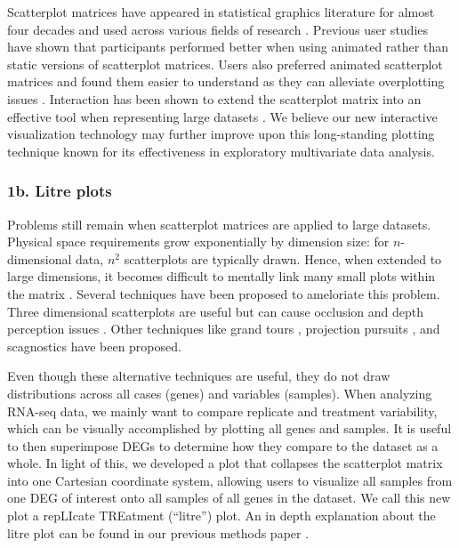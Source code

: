 \documentclass{bmcart}
\begin{document}
Scatterplot matrices have appeared in statistical graphics literature for almost four decades and used across various fields of research \cite{becker1984brushing, carr1984graphical, tufte2001visual, tukey1981graphical}. Previous user studies have shown that participants performed better when using animated rather than static versions of scatterplot matrices. Users also preferred animated scatterplot matrices and found them easier to understand as they can alleviate overplotting issues \cite{chen2018using}. Interaction has been shown to extend the scatterplot matrix into an effective tool when representing large datasets \cite{carr1987scatterplot}. We believe our new interactive visualization technology may further improve upon this long-standing plotting technique known for its effectiveness in exploratory multivariate data analysis.

\subsubsection*{1b. Litre plots}

Problems still remain when scatterplot matrices are applied to large datasets. Physical space requirements grow exponentially by dimension size: for $n$-dimensional data, $n^2$ scatterplots are typically drawn. Hence, when extended to large dimensions, it becomes difficult to mentally link many small plots within the matrix \cite{kerren2007human}. Several techniques have been proposed to ameloriate this problem. Three dimensional scatterplots are useful but can cause occlusion and depth perception issues \cite{kerren2007human}. Other techniques like grand tours \cite{asimov1985grand}, projection pursuits \cite{friedman1974projection, cook1995grand}, and scagnostics \cite{wilkinson2005graph} have been proposed.

Even though these alternative techniques are useful, they do not draw distributions across all cases (genes) and variables (samples). When analyzing RNA-seq data, we mainly want to compare replicate and treatment variability, which can be visually accomplished by plotting all genes and samples. It is useful to then superimpose DEGs to determine how they compare to the dataset as a whole. In light of this, we developed a plot that collapses the scatterplot matrix into one Cartesian coordinate system, allowing users to visualize all samples from one DEG of interest onto all samples of all genes in the dataset. We call this new plot a repLIcate TREatment (``litre'') plot. An in depth explanation about the litre plot can be found in our previous methods paper \cite{rutter1}.
\end{document}
